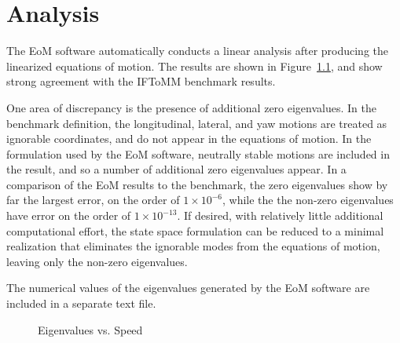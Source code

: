 \chapter{Analysis}
The EoM software automatically conducts a linear analysis after producing the linearized equations of motion.  The results are shown in Figure~\ref{eigen_plot}, and show strong agreement with the IFToMM benchmark results.

One area of discrepancy is the presence of additional zero eigenvalues.  In the benchmark definition, the longitudinal, lateral, and yaw motions are treated as ignorable coordinates, and do not appear in the equations of motion.  In the formulation used by the EoM software, neutrally stable motions are included in the result, and so a number of additional zero eigenvalues appear.  In a comparison of the EoM results to the benchmark, the zero eigenvalues show by far the largest error, on the order of $1\times10^{-6}$, while the the non-zero eigenvalues have error on the order of $1\times10^{-13}$.  If desired, with relatively little additional computational effort, the state space formulation can be reduced to a minimal realization that eliminates the ignorable modes from the equations of motion, leaving only the non-zero eigenvalues.

The numerical values of the eigenvalues generated by the EoM software are included in a separate text file.

\begin{figure}[htbp]
\begin{center}
\caption{Eigenvalues vs. Speed}
\label{eigen_plot}
\end{center}
\end{figure}
